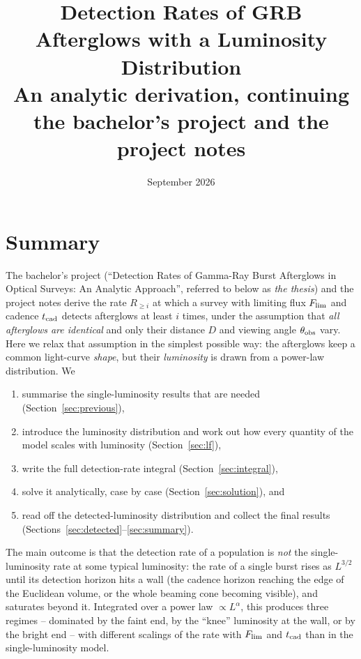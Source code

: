 \documentclass[11pt,a4paper]{article}
\title{\textbf{Detection Rates of GRB Afterglows with a Luminosity Distribution}\\
\large An analytic derivation, continuing the bachelor's project and the project notes}
\author{}
\date{September 2026}
\newcommand{\Flim}{F_{\rm lim}}
\newcommand{\tcad}{t_{\rm cad}}
\begin{document}
\maketitle
\thispagestyle{empty}

\section*{Summary}

The bachelor's project (``Detection Rates of Gamma-Ray Burst Afterglows in Optical Surveys: An Analytic Approach'', referred to below as \emph{the thesis}) and the project notes derive the rate $R_{\geq i}$ at which a survey with limiting flux $\Flim$ and cadence $\tcad$ detects afterglows at least $i$ times, under the assumption that \emph{all afterglows are identical} and only their distance $D$ and viewing angle $\theta_{\rm obs}$ vary. Here we relax that assumption in the simplest possible way: the afterglows keep a common light-curve \emph{shape}, but their \emph{luminosity} is drawn from a power-law distribution. We

\begin{enumerate}
\item summarise the single-luminosity results that are needed (Section~\ref{sec:previous}),
\item introduce the luminosity distribution and work out how every quantity of the model scales with luminosity (Section~\ref{sec:lf}),
\item write the full detection-rate integral (Section~\ref{sec:integral}),
\item solve it analytically, case by case (Section~\ref{sec:solution}), and
\item read off the detected-luminosity distribution and collect the final results (Sections~\ref{sec:detected}--\ref{sec:summary}).
\end{enumerate}

The main outcome is that the detection rate of a population is \emph{not} the single-luminosity rate at some typical luminosity: the rate of a single burst rises as $L^{3/2}$ until its detection horizon hits a wall (the cadence horizon reaching the edge of the Euclidean volume, or the whole beaming cone becoming visible), and saturates beyond it. Integrated over a power law $\propto L^{\alpha}$, this produces three regimes -- dominated by the faint end, by the ``knee'' luminosity at the wall, or by the bright end -- with different scalings of the rate with $\Flim$ and $\tcad$ than in the single-luminosity model.
\end{document}
